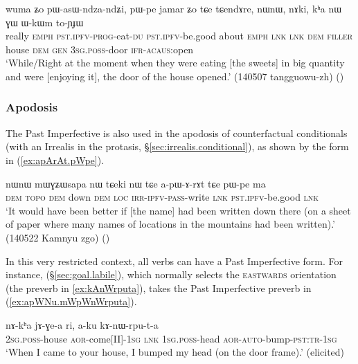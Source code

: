 \begin{exe}
\ex \label{ex:pasWndzandZi.pWpe}
\gll wuma ʑo pɯ-asɯ-ndza-ndʑi,  pɯ-pe jamar ʑo tɕe tɕendɤre, nɯnɯ, nɤki, kʰa nɯ ɣɯ ɯ-kɯm to-ɲɟɯ\\
really \textsc{emph} \textsc{pst}.\textsc{ipfv}-\textsc{prog}-eat-\textsc{du} \textsc{pst}.\textsc{ipfv}-be.good about \textsc{emph} \textsc{lnk} \textsc{lnk} \textsc{dem} \textsc{filler} house \textsc{dem} \textsc{gen} \textsc{3sg}.\textsc{poss}-door \textsc{ifr}-\textsc{acaus}:open\\
\glt `While/Right at the moment when they were eating [the sweets] in big quantity and were [enjoying it], the door of the house opened.' (140507 tangguowu-zh)
()
\end{exe}

\subsubsection{Apodosis} \label{sec:pst.ifr.ipfv.apodosis}
The Past Imperfective is also used in the apodosis of counterfactual conditionals (with an Irrealis in the protasis, §\ref{sec:irrealis.conditional}), as shown by the form  in (\ref{ex:apArAt.pWpe}).

\begin{exe}
\ex \label{ex:apArAt.pWpe}
\gll nɯnɯ mɯɣʑɯsapa nɯ tɕeki nɯ tɕe a-pɯ-ɤ-rɤt tɕe pɯ-pe ma \\ 
\textsc{dem}  \textsc{topo} \textsc{dem} down \textsc{dem} \textsc{loc} \textsc{irr}-\textsc{ipfv}-\textsc{pass}-write \textsc{lnk} \textsc{pst}.\textsc{ipfv}-be.good \textsc{lnk} \\
\glt `It would have been better if [the name]  had been written down there (on a sheet of paper where many names of locations in the mountains had been written).' (140522  Kamnyu zgo) ()
\end{exe}

In this very restricted context, all verbs can have a Past Imperfective form. For instance,  (§\ref{sec:goal.labile}), which normally selects the \textsc{eastwards} orientation (the preverb  in \ref{ex:kAnWrputa}), takes the  Past Imperfective preverb in (\ref{ex:apWNu.mWpWnWrputa}).

\begin{exe}
\ex \label{ex:kAnWrputa}
\gll nɤ-kʰa jɤ-ɣe-a ri, a-ku kɤ-nɯ-rpu-t-a \\
\textsc{2sg}.\textsc{poss}-house \textsc{aor}-come[II]-\textsc{1sg} \textsc{lnk} \textsc{1sg}.\textsc{poss}-head \textsc{aor}-\textsc{auto}-bump-\textsc{pst}:\textsc{tr}-\textsc{1sg} \\
\glt `When I came to your house, I bumped my head (on the door frame).' (elicited)
\end{exe}

